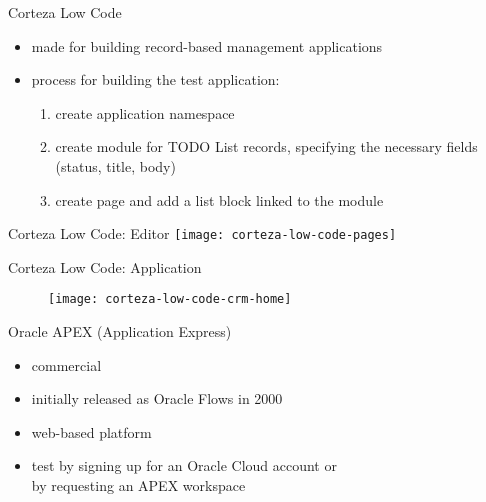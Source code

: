 \documentclass[aspectratio=169]{beamer}
\begin{document}
  \begin{frame}{Corteza Low Code}
    \begin{itemize}
      \item made for building record-based management applications
      \item process for building the test application:
        \begin{enumerate}
          \item create application namespace
          \item create module for TODO List records, specifying the necessary fields (status, title, body)
          \item create page and add a list block linked to the module
        \end{enumerate}
    \end{itemize}
  \end{frame}

  \begin{frame}[standout]{Corteza Low Code: Editor}
    \texttt{[image: corteza-low-code-pages]}
  \end{frame}

  \begin{frame}[standout]{Corteza Low Code: Application}
    \begin{figure}
      \texttt{[image: corteza-low-code-crm-home]}
    \end{figure}
  \end{frame}

  \begin{frame}{Oracle APEX (Application Express)}
    \begin{itemize}
      \item commercial
      \item initially released as Oracle Flows in 2000
      \item web-based platform
      \item test by signing up for an Oracle Cloud account or \\
            by requesting an APEX workspace
    \end{itemize}
  \end{frame}
\end{document}
